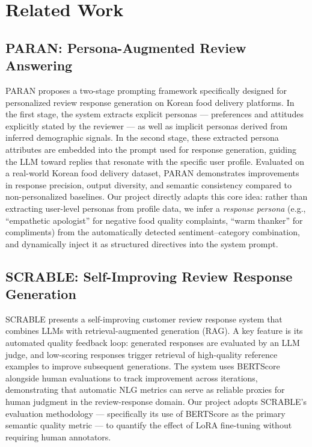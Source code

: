 \documentclass[conference]{IEEEtran}
\begin{document}
\section{Related Work}

\subsection{PARAN: Persona-Augmented Review Answering~\cite{paran2024}}
PARAN proposes a two-stage prompting framework specifically designed
for personalized review response generation on Korean food delivery
platforms.
In the first stage, the system extracts explicit personas — preferences
and attitudes explicitly stated by the reviewer — as well as implicit
personas derived from inferred demographic signals.
In the second stage, these extracted persona attributes are embedded
into the prompt used for response generation, guiding the LLM toward
replies that resonate with the specific user profile.
Evaluated on a real-world Korean food delivery dataset, PARAN
demonstrates improvements in response precision, output diversity,
and semantic consistency compared to non-personalized baselines.
Our project directly adapts this core idea: rather than extracting
user-level personas from profile data, we infer a \textit{response
persona} (e.g., ``empathetic apologist'' for negative food quality
complaints, ``warm thanker'' for compliments) from the automatically
detected sentiment--category combination, and dynamically inject it
as structured directives into the system prompt.

\subsection{SCRABLE: Self-Improving Review Response Generation~\cite{scrable2024}}
SCRABLE presents a self-improving customer review response system that
combines LLMs with retrieval-augmented generation (RAG).
A key feature is its automated quality feedback loop: generated
responses are evaluated by an LLM judge, and low-scoring responses
trigger retrieval of high-quality reference examples to improve
subsequent generations.
The system uses BERTScore alongside human evaluations to track
improvement across iterations, demonstrating that automatic NLG
metrics can serve as reliable proxies for human judgment in the
review-response domain.
Our project adopts SCRABLE's evaluation methodology — specifically its
use of BERTScore as the primary semantic quality metric — to quantify
the effect of LoRA fine-tuning without requiring human annotators.
\end{document}
